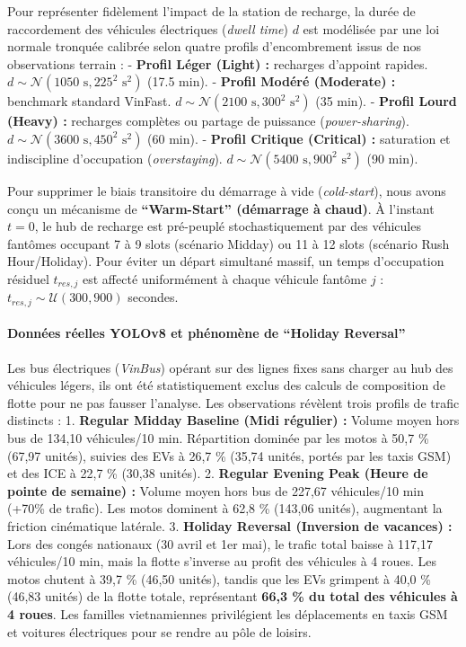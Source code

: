\documentclass[10pt, a4paper]{article}
\begin{document}
Pour représenter fidèlement l'impact de la station de recharge, la durée
de raccordement des véhicules électriques (\emph{dwell time}) \(d\) est
modélisée par une loi normale tronquée calibrée selon quatre profils
d'encombrement issus de nos observations terrain : - \textbf{Profil
Léger (Light) :} recharges d'appoint rapides.
\(d \sim \mathcal{N}(1050\text{ s}, 225^2\text{ s}^2)\) (17.5 min). -
\textbf{Profil Modéré (Moderate) :} benchmark standard VinFast.
\(d \sim \mathcal{N}(2100\text{ s}, 300^2\text{ s}^2)\) (35 min). -
\textbf{Profil Lourd (Heavy) :} recharges complètes ou partage de
puissance (\emph{power-sharing}).
\(d \sim \mathcal{N}(3600\text{ s}, 450^2\text{ s}^2)\) (60 min). -
\textbf{Profil Critique (Critical) :} saturation et indiscipline
d'occupation (\emph{overstaying}).
\(d \sim \mathcal{N}(5400\text{ s}, 900^2\text{ s}^2)\) (90 min).

Pour supprimer le biais transitoire du démarrage à vide
(\emph{cold-start}), nous avons conçu un mécanisme de
\textbf{``Warm-Start'' (démarrage à chaud)}. À l'instant \(t=0\), le hub
de recharge est pré-peuplé stochastiquement par des véhicules fantômes
occupant 7 à 9 slots (scénario Midday) ou 11 à 12 slots (scénario Rush
Hour/Holiday). Pour éviter un départ simultané massif, un temps
d'occupation résiduel \(t_{res, j}\) est affecté uniformément à chaque
véhicule fantôme \(j\) : \(t_{res, j} \sim \mathcal{U}(300, 900)\)
secondes.

\paragraph{Données réelles YOLOv8 et phénomène de ``Holiday
Reversal''}\label{donnuxe9es-ruxe9elles-yolov8-et-phuxe9nomuxe8ne-de-holiday-reversal}

Les bus électriques (\emph{VinBus}) opérant sur des lignes fixes sans
charger au hub des véhicules légers, ils ont été statistiquement exclus
des calculs de composition de flotte pour ne pas fausser l'analyse. Les
observations révèlent trois profils de trafic distincts : 1.
\textbf{Regular Midday Baseline (Midi régulier) :} Volume moyen hors bus
de 134,10 véhicules/10 min. Répartition dominée par les motos à 50,7 \%
(67,97 unités), suivies des EVs à 26,7 \% (35,74 unités, portés par les
taxis GSM) et des ICE à 22,7 \% (30,38 unités). 2. \textbf{Regular
Evening Peak (Heure de pointe de semaine) :} Volume moyen hors bus de
227,67 véhicules/10 min (+70\% de trafic). Les motos dominent à 62,8 \%
(143,06 unités), augmentant la friction cinématique latérale. 3.
\textbf{Holiday Reversal (Inversion de vacances) :} Lors des congés
nationaux (30 avril et 1er mai), le trafic total baisse à 117,17
véhicules/10 min, mais la flotte s'inverse au profit des véhicules à 4
roues. Les motos chutent à 39,7 \% (46,50 unités), tandis que les EVs
grimpent à 40,0 \% (46,83 unités) de la flotte totale, représentant
\textbf{66,3 \% du total des véhicules à 4 roues}. Les familles
vietnamiennes privilégient les déplacements en taxis GSM et voitures
électriques pour se rendre au pôle de loisirs.
\end{document}
